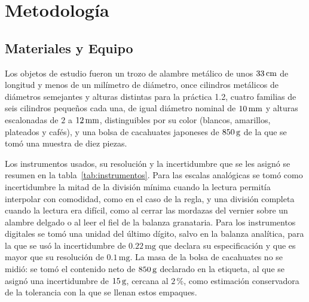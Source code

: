 \section{Metodología}

\subsection{Materiales y Equipo}

Los objetos de estudio fueron un trozo de alambre metálico de unos $33\,\mathrm{cm}$ de longitud y menos de un milímetro de diámetro, once cilindros metálicos de diámetros semejantes y alturas distintas para la práctica 1.2, cuatro familias de seis cilindros pequeños cada una, de igual diámetro nominal de $10\,\mathrm{mm}$ y alturas escalonadas de $2$ a $12\,\mathrm{mm}$, distinguibles por su color (blancos, amarillos, plateados y cafés), y una bolsa de cacahuates japoneses de $850\,\mathrm{g}$ de la que se tomó una muestra de diez piezas.

Los instrumentos usados, su resolución y la incertidumbre que se les asignó se resumen en la tabla~\ref{tab:instrumentos}. Para las escalas analógicas se tomó como incertidumbre la mitad de la división mínima cuando la lectura permitía interpolar con comodidad, como en el caso de la regla, y una división completa cuando la lectura era difícil, como al cerrar las mordazas del vernier sobre un alambre delgado o al leer el fiel de la balanza granataria. Para los instrumentos digitales se tomó una unidad del último dígito, salvo en la balanza analítica, para la que se usó la incertidumbre de $0.22\,\mathrm{mg}$ que declara su especificación y que es mayor que su resolución de $0.1\,\mathrm{mg}$. La masa de la bolsa de cacahuates no se midió: se tomó el contenido neto de $850\,\mathrm{g}$ declarado en la etiqueta, al que se asignó una incertidumbre de $15\,\mathrm{g}$, cercana al $2\,\%$, como estimación conservadora de la tolerancia con la que se llenan estos empaques.

